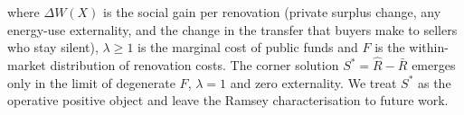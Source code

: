 where $\Delta W(X)$ is the social gain per renovation (private surplus change, any energy-use externality, and the change in the transfer that buyers make to sellers who stay silent), $\lambda\ge 1$ is the marginal cost of public funds and $F$ is the within-market distribution of renovation costs. The corner solution $S^* = \hat R - \bar R$ emerges only in the limit of degenerate $F$, $\lambda=1$ and zero externality. We treat $S^*$ as the operative positive object and leave the Ramsey characterisation to future work.
